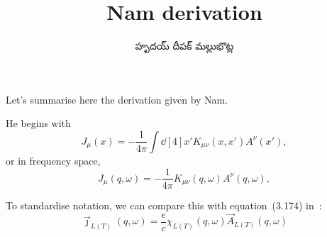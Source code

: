 \documentclass[../main.tex]{subfiles}
\title{Nam derivation}
\author{\begin{telugu}హృదయ్ దీపక్ మల్లుభొట్ల\end{telugu}}
\date{}
\begin{document}
	\onlyinsubfile{\maketitle}

	Let's summarise here the derivation given by Nam\supercite{Nam1967}.

	He begins with
	\begin{equation}
		J_\mu(x) = - \frac{1}{4\pi}\int \dd[4]{x'} K_{\mu\nu}(x, x') A^\nu(x'),
	\end{equation}
	or in frequency space,
	\begin{equation}
		J_\mu(q, \omega) = - \frac{1}{4\pi} K_{\mu\nu}(q, \omega) A^\nu(q, \omega),
	\end{equation}

	To standardise notation, we can compare this with equation~(3.174) in~\cite{Giuliani2005}:
	\begin{equation}
		\vec{\jmath}_{L(T)}(q, \omega) = \frac{e}{c} \chi_{L(T)}(q, \omega) \vec{A}_{L(T)}(q, \omega)
	\end{equation}
\end{document}
